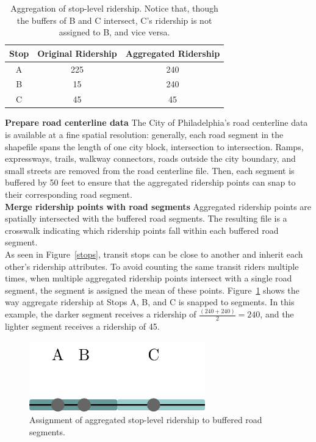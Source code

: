 \documentclass[paper=letterpaper, fontsize=11pt]{scrartcl}
\begin{document}
\begin{table}[!htbp]
	\renewcommand*{\arraystretch}{1.4}
	\centering 
	\caption{Aggregation of stop-level ridership. Notice that, though the buffers of B and C intersect, C's ridership is not assigned to B, and vice versa.} \label{sample-stops}
	\begin{tabular}{|c c c|} 
		\hline 
		\textbf{Stop} & \textbf{Original Ridership} & \textbf{Aggregated Ridership} \\
		\hline
		A & 225 & 240 \\
		\hline
		B & 15 & 240 \\
		\hline
		C & 45 & 45 \\
		\hline
	\end{tabular} 
\end{table}

\textbf{Prepare road centerline data}
The City of Philadelphia's road centerline data is available at a fine spatial resolution: generally, each road segment in the shapefile spans the length of one city block, intersection to intersection. Ramps, expressways, trails, walkway connectors, roads outside the city boundary, and small streets are removed from the road centerline file. Then, each segment is buffered by 50 feet to ensure that the aggregated ridership points can snap to their corresponding road segment. \\

\textbf{Merge ridership points with road segments}
Aggregated ridership points are spatially intersected with the buffered road segments. The resulting file is a crosswalk indicating which ridership points fall within each buffered road segment. \\

As seen in Figure~\ref{stops}, transit stops can be close to another and inherit each other's ridership attributes. To avoid counting the same transit riders multiple times, when multiple aggregated ridership points intersect with a single road segment, the segment is assigned the mean of these points. Figure~\ref{segments} shows the way aggregate ridership at Stops A, B, and C is snapped to segments. In this example, the darker segment receives a ridership of $\frac{\left(240 + 240\right)}{2} = 240$, and the lighter segment receives a ridership of 45.

\begin{figure}[!htbp]
	\centering
	\includegraphics[width=3in]{stopdiagsegmentized.png}
	\caption{Assignment of aggregated stop-level ridership to buffered road segments.} \label{segments}
\end{figure}
\end{document}
